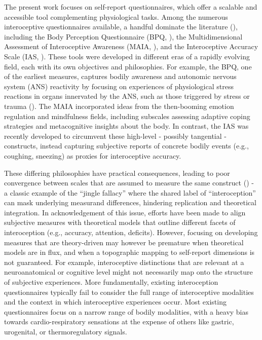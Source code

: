 \documentclass[
  jou,
  floatsintext,
  longtable,
  nolmodern,
  notxfonts,
  notimes,
  colorlinks=true,linkcolor=blue,citecolor=blue,urlcolor=blue]{apa7}
\begin{document}
The present work focuses on self-report questionnaires, which offer a
scalable and accessible tool complementing physiological tasks. Among
the numerous interoceptive questionnaires available, a handful dominate
the literature (), including the Body Perception Questionnaire (BPQ,
), the
Multidimensional Assessment of Interoceptive Awareness (MAIA,
), and
the Interoceptive Accuracy Scale (IAS,
). These tools
were developed in different eras of a rapidly evolving field, each with
its own objectives and philosophies. For example, the BPQ, one of the
earliest measures, captures bodily awareness and autonomic nervous
system (ANS) reactivity by focusing on experiences of physiological
stress reactions in organs innervated by the ANS, such as those
triggered by stress or trauma (). The MAIA incorporated ideas from the then-booming emotion
regulation and mindfulness fields, including subscales assessing
adaptive coping strategies and metacognitive insights about the body. In
contrast, the IAS was recently developed to circumvent these high-level
- possibly tangential - constructs, instead capturing subjective reports
of concrete bodily events (e.g., coughing, sneezing) as proxies for
interoceptive accuracy.

These differing philosophies have practical consequences, leading to
poor convergence between scales that are assumed to measure the same
construct () - a
classic example of the ``jingle fallacy'' where the shared label of
``interoception'' can mask underlying measurand differences, hindering
replication and theoretical integration. In acknowledgement of this
issue, efforts have been made to align subjective measures with
theoretical models that outline different facets of interoception (e.g.,
accuracy, attention, deficits). However, focusing on developing measures
that are theory-driven may however be premature when theoretical models
are in flux, and when a topographic mapping to self-report dimensions is
not guaranteed. For example, interoceptive distinctions that are
relevant at a neuroanatomical or cognitive level might not necessarily
map onto the structure of subjective experiences. More fundamentally,
existing interoception questionnaires typically fail to consider the
full range of interoceptive modalities and the context in which
interoceptive experiences occur. Most existing questionnaires focus on a
narrow range of bodily modalities, with a heavy bias towards
cardio-respiratory sensations at the expense of others like gastric,
urogenital, or thermoregulatory signals.
\end{document}

